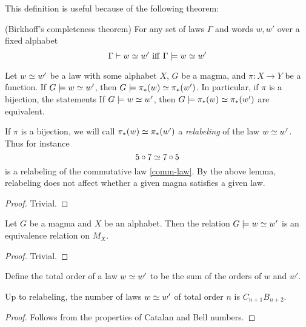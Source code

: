 This definition is useful because of the following theorem:

\begin{theorem}[Completeness]\label{sound-complete}\leanok (Birkhoff's completeness theorem)
  For any set of laws $\Gamma$ and words $w, w'$ over a fixed alphabet
  $$ \Gamma\vdash w\simeq w'\ \mathrm{iff}\ \Gamma\models w\simeq w' $$
\end{theorem}

\begin{lemma}[Pushforward]\label{push}  Let $w \simeq w'$ be a law with some alphabet $X$, $G$ be a magma, and $\pi: X \to Y$ be a function.  If $G \models w \simeq w'$, then $G \models \pi_*(w) \simeq \pi_*(w')$.  In particular, if $\pi$ is a bijection, the statements If $G \models w \simeq w'$, then $G \models \pi_*(w) \simeq \pi_*(w')$ are equivalent.
\end{lemma}

If $\pi$ is a bijection, we will call $\pi_*(w) \simeq \pi_*(w')$ a \emph{relabeling} of the law $w \simeq w'$.  Thus for instance
$$ 5 \circ 7 \simeq 7 \circ 5$$
is a relabeling of the commutative law \eqref{comm-law}.  By the above lemma, relabeling does not affect whether a given magna satisfies a given law.

\begin{proof}  Trivial.
\end{proof}

\begin{lemma}[Equivalence]\label{equiv}  Let $G$ be a magma and $X$ be an alphabet.  Then the relation $G \models w \simeq w'$ is an equivalence relation on $M_X$.
\end{lemma}

\begin{proof}  Trivial.
\end{proof}

Define the total order of a law $w \simeq w'$ to be the sum of the orders of $w$ and $w'$.

\begin{lemma}\label{law-count}  Up to relabeling, the number of laws $w \simeq w'$ of total order $n$ is $C_{n+1} B_{n+2}$.
\end{lemma}

\begin{proof} Follows from the properties of Catalan and Bell numbers.
\end{proof}

